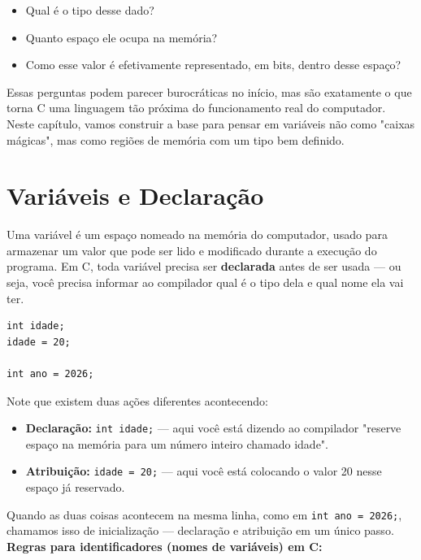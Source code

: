 \documentclass[12pt,a4paper,oneside]{extreport}
\begin{document}
\begin{itemize}
    \item Qual é o tipo desse dado?
    \item Quanto espaço ele ocupa na memória?
    \item Como esse valor é efetivamente representado, em bits, dentro desse espaço?
\end{itemize}

Essas perguntas podem parecer burocráticas no início, mas são exatamente o que torna C uma linguagem tão próxima do funcionamento real do computador. Neste capítulo, vamos construir a base para pensar em variáveis não como "caixas mágicas", mas como regiões de memória com um tipo bem definido.

\section{Variáveis e Declaração}

Uma variável é um espaço nomeado na memória do computador, usado para armazenar um valor que pode ser lido e modificado durante a execução do programa. Em C, toda variável precisa ser \textbf{declarada} antes de ser usada — ou seja, você precisa informar ao compilador qual é o tipo dela e qual nome ela vai ter.

\begin{lstlisting}
int idade;
idade = 20;

int ano = 2026;
\end{lstlisting}

Note que existem duas ações diferentes acontecendo:

\begin{itemize}

    \item \textbf{Declaração:} \texttt{int idade;} — aqui você está dizendo ao compilador "reserve espaço na memória para um número inteiro chamado idade".
    \item \textbf{Atribuição:} \texttt{idade = 20;} — aqui você está colocando o valor 20 nesse espaço já reservado.

\end{itemize}

Quando as duas coisas acontecem na mesma linha, como em \texttt{int ano = 2026;}, chamamos isso de inicialização — declaração e atribuição em um único passo. \\

\textbf{Regras para identificadores (nomes de variáveis) em C:}
\end{document}
